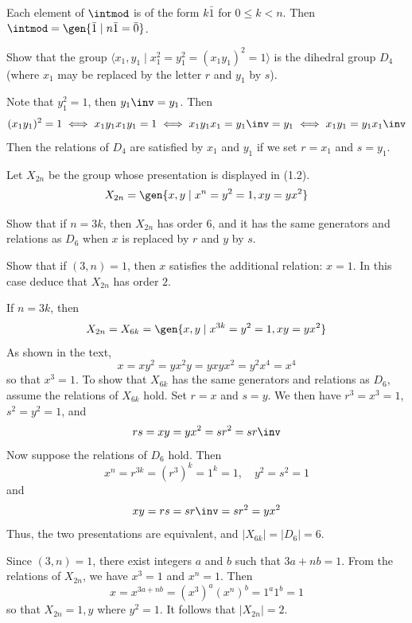 \begin{sol}
    Each element of $\intmod$ is of the form $k\bar 1$ for $0 \leq k < n$. Then $\intmod = \gen{\bar 1 \mid n\bar 1 = \bar 0}$.
\end{sol}

\begin{exercise}\label{ex1.2.16}
    Show that the group $\langle x_1, y_1 \mid x_1^2 = y_1^2 = (x_1 y_1)^2 = 1 \rangle$ is the dihedral group $D_4$ (where $x_1$ may be replaced by the letter $r$ and $y_1$ by $s$).

\end{exercise}

\begin{sol}
    Note that $y_1^2 = 1$, then $y_1\inv = y_1$. Then
    \[(x_1y_1)^2 = 1 \iff x_1y_1x_1y_1 = 1 \iff x_1y_1x_1 = y_1\inv = y_1 \iff x_1y_1 = y_1x_1\inv\]
    Then the relations of $D_4$ are satisfied by $x_1$ and $y_1$ if we set $r = x_1$ and $s = y_1$.
\end{sol}

\begin{exercise}\label{ex1.2.17}
    Let $X_{2n}$ be the group whose presentation is displayed in (1.2).
    \[X_{2n} = \gen{x, y \mid x^n = y^2 = 1, xy = yx^2}\]
    \begin{subproblems}
        \item Show that if $n = 3k$, then $X_{2n}$ has order $6$, and it has the same generators and relations as $D_6$ when $x$ is replaced by $r$ and $y$ by $s$.
        \item Show that if $(3, n) = 1$, then $x$ satisfies the additional relation: $x = 1$. In this case deduce that $X_{2n}$ has order $2$.
        
    \end{subproblems}
\end{exercise}

\begin{solalph}
    \item If $n = 3k$, then
    \[X_{2n} = X_{6k} = \gen{x, y \mid x^{3k} = y^2 = 1, xy = yx^2}\]
    As shown in the text, 
    \[x = xy^2 = yx^2y = yxyx^2 = y^2x^4 = x^4\]
    so that $x^3 = 1$. To show that $X_{6k}$ has the same generators and relations as $D_6$, assume the relations of $X_{6k}$ hold. Set $r = x$ and $s = y$. We then have $r^3 = x^3 = 1$, $s^2 = y^2 = 1$, and
    \[rs = xy = yx^2 = sr^2 = sr\inv\]
    Now suppose the relations of $D_6$ hold. Then
    \[x^n = r^{3k} = (r^3)^k = 1^k = 1, \quad y^2 = s^2 = 1\]
    and
    \[xy = rs = sr\inv = sr^2 = yx^2\]
    Thus, the two presentations are equivalent, and $|X_{6k}| = |D_6| = 6$.
    \item Since $(3, n) = 1$, there exist integers $a$ and $b$ such that $3a + nb = 1$. From the relations of $X_{2n}$, we have $x^3 = 1$ and $x^n = 1$. Then
    \[x = x^{3a + nb} = (x^3)^a (x^n)^b = 1^a 1^b = 1\]
    so that $X_{2n} = {1, y}$ where $y^2 = 1$. It follows that $|X_{2n}| = 2$.
\end{solalph}

